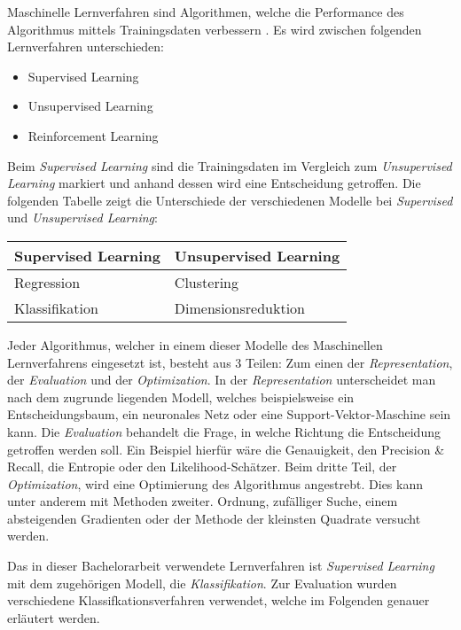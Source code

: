 Maschinelle Lernverfahren sind Algorithmen, welche die Performance des Algorithmus mittels Trainingsdaten verbessern \cite{neumannMaschineLearningKIT2020}. 
Es wird zwischen folgenden Lernverfahren unterschieden:
\begin{itemize}
    \item Supervised Learning
    \item Unsupervised Learning
    \item Reinforcement Learning
\end{itemize}
Beim \textit{Supervised Learning} sind die Trainingsdaten im Vergleich zum \textit{Unsupervised Learning} markiert und anhand dessen wird eine Entscheidung getroffen. 
Die folgenden Tabelle zeigt die Unterschiede der verschiedenen Modelle bei \textit{Supervised} und \textit{Unsupervised Learning}:
\begin{center}
    \begin{tabular}{ | l | l | }
      \hline
      \textbf{Supervised Learning} & \textbf{Unsupervised Learning} \\ \hline
      \hline
      Regression & Clustering \\ \hline
      Klassifikation & Dimensionsreduktion \\
      \hline
    \end{tabular}
\end{center}

Jeder Algorithmus, welcher in einem dieser Modelle des Maschinellen Lernverfahrens eingesetzt ist, besteht aus 3 Teilen: Zum einen der \textit{Representation}, der \textit{Evaluation} und der \textit{Optimization}. 
In der \textit{Representation} unterscheidet man nach dem zugrunde liegenden Modell, welches beispielsweise ein Entscheidungsbaum, ein neuronales Netz oder eine Support-Vektor-Maschine sein kann.
Die \textit{Evaluation} behandelt die Frage, in welche Richtung die Entscheidung getroffen werden soll. 
Ein Beispiel hierfür wäre die Genauigkeit, den Precision \& Recall, die Entropie oder den Likelihood-Schätzer.
Beim dritte Teil, der \textit{Optimization}, wird eine Optimierung des Algorithmus angestrebt. 
Dies kann unter anderem mit Methoden zweiter. Ordnung, zufälliger Suche, einem absteigenden Gradienten oder der Methode der kleinsten Quadrate versucht werden.

Das in dieser Bachelorarbeit verwendete Lernverfahren ist \textit{Supervised Learning} mit dem zugehörigen Modell, die \textit{Klassifikation}.
Zur Evaluation wurden verschiedene Klassifkationsverfahren verwendet, welche im Folgenden genauer erläutert werden.

